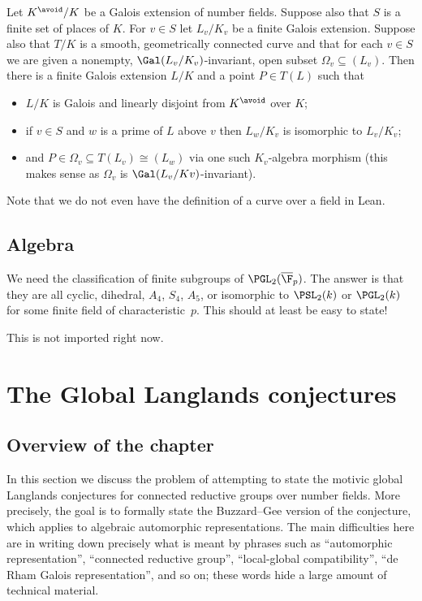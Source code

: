 \begin{theorem}\label{moret-bailly}\notready Let $K^{\avoid}/K$ be a Galois extension of number fields. Suppose also
that $S$ is a finite set of places of $K$. For $v\in S$ let $L_v/K_v$ be a finite Galois extension.
Suppose also that $T /K$ is a smooth, geometrically connected curve and that for each
$v\in S$ we are given a nonempty, $\Gal(L_v/K_v)$-invariant, open subset $\Omega_v\subseteq (L_v)$.
Then there is a finite Galois extension $L/K$ and a point $P ∈ T (L)$ such that
\begin{itemize}
\item $L/K$ is Galois and linearly disjoint from $K^{\avoid}$ over $K$;
\item if $v\in S$ and $w$ is a prime of $L$ above $v$ then $L_w /K_v$ is isomorphic to $L_v/K_v$;
\item and $P \in\Omega_v\subseteq T (L_v) \cong (L_w)$ via one such $K_v$-algebra morphism
(this makes sense as $\Omega_v$ is $\Gal(L_v/K v)$-invariant).
\end{itemize}
\end{theorem}

Note that we do not even have the definition of a curve over a field in Lean.

\section{Algebra}

We need the classification of finite subgroups of $\PGL_2(\overline{\F}_p)$. The answer is that they are all cyclic, dihedral, $A_4$, $S_4$, $A_5$, or isomorphic to $\PSL_2(k)$ or $\PGL_2(k)$ for some finite field of characteristic~$p$. This should at least be easy to state!


This is not imported right now.

\chapter{The Global Langlands conjectures}

\section{Overview of the chapter}

In this section we discuss the problem of attempting to state the motivic global Langlands conjectures for connected reductive groups over number fields. More precisely, the goal is to formally state the Buzzard--Gee version of the conjecture, which applies to algebraic automorphic representations. The main difficulties here are in writing down precisely what is meant by phrases such as ``automorphic representation'', ``connected reductive group'', ``local-global compatibility'', ``de Rham Galois representation'', and so on; these words hide a large amount of technical material.

